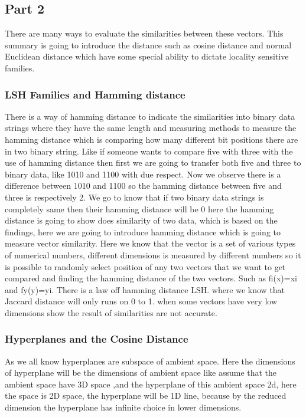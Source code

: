 \documentclass[12t]{article}
\begin{document}
	\subsection*{Part 2}
	
	There are many ways to evaluate the similarities between these vectors. This summary is going to introduce the distance such as cosine distance and normal Euclidean distance which have some special ability to dictate locality sensitive families.
	
	\subsubsection*{LSH Families and Hamming distance}
	 
	There is a way of hamming distance to indicate the similarities into binary data strings where they have the same length and measuring methods to measure the hamming distance which is comparing how many different bit positions there are in two binary string. Like if someone wants to compare five with three with the use of hamming distance then first we are going to transfer both five and three to binary data, like 1010 and 1100 with due respect. Now we observe there  is a difference between 1010 and 1100 so the hamming distance between five and three is respectively 2. We go to know that if two binary data strings is completely same then their hamming distance will be 0 here the hamming distance is going to show does similarity of two data, which is based on the findings, here we are going to introduce hamming distance which is going to measure vector similarity. Here we know that the vector is a set of various types of numerical numbers, different dimensions is measured by different numbers so it is possible to randomly select position of any two vectors that we want to get compared and finding the hamming distance of the two vectors. Such as fi(x)=xi and fy(y)=yi. There is a law off hamming distance LSH. where we know that Jaccard distance will only runs on 0 to 1. when some vectors have very low dimensions show the result of similarities are not accurate.
	
	\subsubsection*{Hyperplanes and the Cosine Distance}

	As we all know hyperplanes are subspace of ambient space. Here the dimensions of hyperplane will be the dimensions of ambient space like assume that the ambient space have 3D space ,and the hyperplane of this ambient space 2d, here the space is 2D space, the hyperplane will be 1D line, because by the reduced dimension the hyperplane has infinite choice in lower dimensions.



\end{document}

